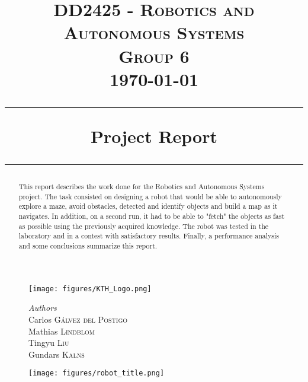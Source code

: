 \begin{titlepage}
\date{}
\begin{figure}
\centering
\texttt{[image: figures/KTH\_Logo.png]}
\end{figure}
\title{
\vspace{-1cm}
\textsc{DD2425 - Robotics and Autonomous Systems}
\\
\vspace{0.5cm}
\textsc{Group 6}\\
{\large \today}
\begin{center}
\rule{\linewidth}{0.5mm}
\textbf{Project Report}
\rule{\linewidth}{0.5mm}
\end{center}
}
\maketitle
\vspace{-2cm}
\begin{figure}[h]
\centering
\begin{minipage}[b]{0.5\linewidth}
                \begin{flushleft}
\normalsize{
\emph{Authors}\\
\vspace{0.5cm}
Carlos \textsc{Gálvez del Postigo} \\
Mathias \textsc{Lindblom} \\
Tingyu \textsc{Liu} \\
Gundars \textsc{Kalns}
}
\end{flushleft}
\end{minipage}
\qquad
\quad
\begin{minipage}[b]{0.4\linewidth}
                \texttt{[image: figures/robot\_title.png]}
\end{minipage}
\end{figure}
\vspace{1cm}
\thispagestyle{empty}
\begin{abstract}
This report describes the work done for the Robotics and Autonomous Systems project. The task consisted on designing a robot that would be able to autonomously explore a maze, avoid obstacles, detected and identify objects and build a map as it navigates. In addition, on a second run, it had to be able to "fetch" the objects as fast as possible using the previously acquired knowledge. The robot was tested in the laboratory and in a contest with satisfactory results. Finally, a performance analysis and some conclusions summarize this report. 
\end{abstract}
\end{titlepage}